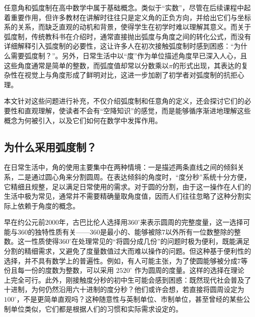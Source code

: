 
\begin{issues}
\issueDraft
\end{issues}

任意角和弧度制在高中数学中属于基础概念。类似于“实数”，尽管在后续课程中起着重要作用，但许多教材在讲解时往往只是定义角的正负方向，并给出它们与坐标系的关系，而缺乏直观的动机和背景，使得学生在初学时难以理解其意义。而关于弧度制，传统教科书在介绍时，通常直接抛出弧度与角度之间的转化公式，而没有详细解释引入弧度制的必要性，这让许多人在初次接触弧度制时感到困惑：“为什么需要弧度制？”。另外，日常生活中以“度”作为单位描述角度早已深入人心，且这些角度通常是简单的整数，而弧度值却常以分数乘以$\pi$的形式出现，其表达的复杂性在视觉上与角度形成了鲜明对比，这进一步加剧了初学者对弧度制的抗拒心理。

本文针对这些问题进行补充，不仅介绍弧度制和任意角的定义，还会探讨它们的必要性和直观理解，使读者不会有“空降知识”的感觉，而是能够循序渐进地理解这些概念为何被引入，以及它们如何在数学中发挥作用。

\subsection{为什么采用弧度制？}

在日常生活中，角的使用主要集中在两种情境：一是描述两条直线之间的倾斜关系，二是通过圆心角来分割圆周。在表达倾斜的角度时，“度分秒”系统十分方便，它精细且规整，足以满足日常使用的需求。对于圆的分割，由于这一操作在人们的生活中极为常见，通常并不需要精确量取角度值，因而人们往往忽略了这种分割实际上依赖于角度的概念。

早在约公元前2000年，古巴比伦人选择用$360^\circ$来表示圆周的完整度量，这一选择可能与360的独特性质有关——360是最小的、能够被除7以外所有一位数整除的整数。这一性质使得$360^\circ$在处理常见的“将圆分成几份”的问题时极为便利，既能满足分割的精细需求，又避免了度量数值过大而难以操作的问题。但这种基于便利性的选择，并不具有数学上的普遍性。例如，有人可能主张，为了使圆能够被分成7等份且每一份的度数为整数，可以采用 $2520^\circ$ 作为圆周的度量。这样的选择在理论上完全可行。此外，刚接触度分秒的初中生可能会感到困惑：既然现代社会普及了十进制，为何仍然沿用六十进制的度分秒？他们或许会想，若直接将圆周设定为 $100^\circ$，不是更简单直观吗？这种随意性与英制单位、市制单位，甚至曾经的某些公制单位类似，它们都是根据人们的习惯和实际需求设定的。

